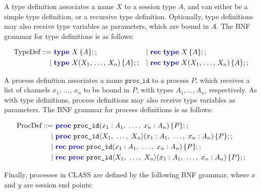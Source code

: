 A type definition associates a name $X$ to a session type $A$, and can either be a simple type definition, or a recursive type definition. Optionally, type definitions may also receive type variables as parameters, which are bound in $A$. The BNF grammar for type definitions is as follows:

\begin{align*}
    \text{TypeDef} ::=\  & \typedefc{X}{A}                     &  & |\ \rectypedefc{X}{A}                     \\
    |\                   & \typedefgc{X}{X_1,\,\dots,\,X_n}{A} &  & |\ \rectypedefgc{X}{X_1,\,\dots,\,X_n}{A} \\
\end{align*}

A process definition associates a name $\texttt{proc\_id}$ to a process $P$, which receives a list of channels $x_1,\,\ldots,\,x_n$ to be bound in $P$, with types $A_1, \ldots, A_n$, respectively. As with type definitions, process definitions may also receive type variables as parameters. The BNF grammar for process definitions is as follows:

\begin{align*}
    \text{ProcDef} ::=\  & \procdefc{proc\_id}{x_1: A_1,\ \dots,\ x_n: A_n}{P}                        \\
    |\                   & \procdefgc{proc\_id}{X_1,\ \dots,\ X_n}{x_1: A_1,\ \dots,\ x_n: A_n}{P}    \\
    |\                   & \recprocdefc{proc\_id}{x_1: A_1,\ \dots,\ x_n: A_n}{P}                     \\
    |\                   & \recprocdefgc{proc\_id}{X_1,\ \dots,\ X_n}{x_1: A_1,\ \dots,\ x_n: A_n}{P}
\end{align*}

Finally, processes in CLASS are defined by the following BNF grammar, where $x$ and $y$ are session end points:

